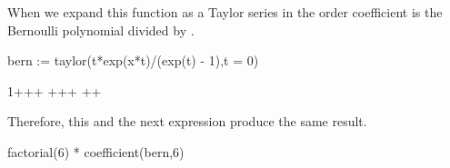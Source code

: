 {{{{{{{{{{{{{{\begin{xtc}
\begin{xtccomment}
When we expand this function as a Taylor series in 
the  order coefficient is the  Bernoulli
polynomial
divided by .
\end{xtccomment}
\begin{spadsrc}
bern := taylor(t*exp(x*t)/(exp(t) - 1),t = 0) 
\end{spadsrc}
\begin{TeXOutput}
\begin{fricasmath}{5}
1+\TIMES {}+\TIMES {}+%
\TIMES {}+\TIMES {}+\TIMES {}+%
\TIMES {}+\TIMES {}+%
\end{fricasmath}
\end{TeXOutput}
\end{xtc}
\begin{xtc}
\begin{xtccomment}
Therefore, this and the next expression
produce the same result.
\end{xtccomment}
\begin{spadsrc}
factorial(6) * coefficient(bern,6) 
\end{spadsrc}
\begin{TeXOutput}
\begin{fricasmath}{6}
%
\end{fricasmath}
\end{TeXOutput}
\end{xtc}
\begin{xtc}

\end{xtc}}}}}}}}}}}}}}}
